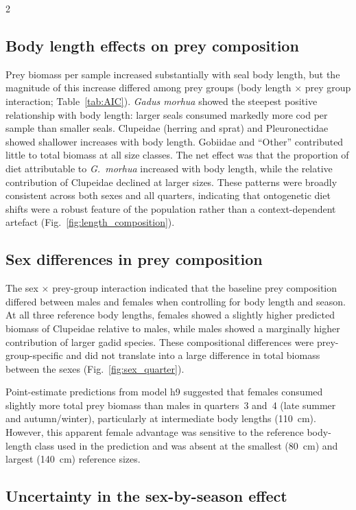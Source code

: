 \begin{spacing}{2}
\subsection{Body length effects on prey composition}

Prey biomass per sample increased substantially with seal body length, but
the magnitude of this increase differed among prey groups (body length
$\times$ prey group interaction; Table~\ref{tab:AIC}). \textit{Gadus morhua}
showed the steepest positive relationship with body length: larger seals
consumed markedly more cod per sample than smaller seals. Clupeidae (herring
and sprat) and Pleuronectidae showed shallower increases with body length.
Gobiidae and ``Other'' contributed little to total biomass at all size
classes. The net effect was that the proportion of diet attributable to
\textit{G.~morhua} increased with body length, while the relative
contribution of Clupeidae declined at larger sizes. These patterns were
broadly consistent across both sexes and all quarters, indicating that
ontogenetic diet shifts were a robust feature of the population rather than
a context-dependent artefact (Fig.~\ref{fig:length_composition}).

\subsection{Sex differences in prey composition}

The sex $\times$ prey-group interaction indicated that the baseline prey
composition differed between males and females when controlling for body
length and season. At all three reference body lengths, females showed a
slightly higher predicted biomass of Clupeidae relative to males, while
males showed a marginally higher contribution of larger gadid species. These
compositional differences were prey-group-specific and did not translate
into a large difference in total biomass between the sexes
(Fig.~\ref{fig:sex_quarter}).

Point-estimate predictions from model h9 suggested that females consumed
slightly more total prey biomass than males in quarters~3 and~4 (late summer
and autumn/winter), particularly at intermediate body lengths (110~cm).
However, this apparent female advantage was sensitive to the reference
body-length class used in the prediction and was absent at the smallest
(80~cm) and largest (140~cm) reference sizes.

\subsection{Uncertainty in the sex-by-season effect}


\end{spacing}

